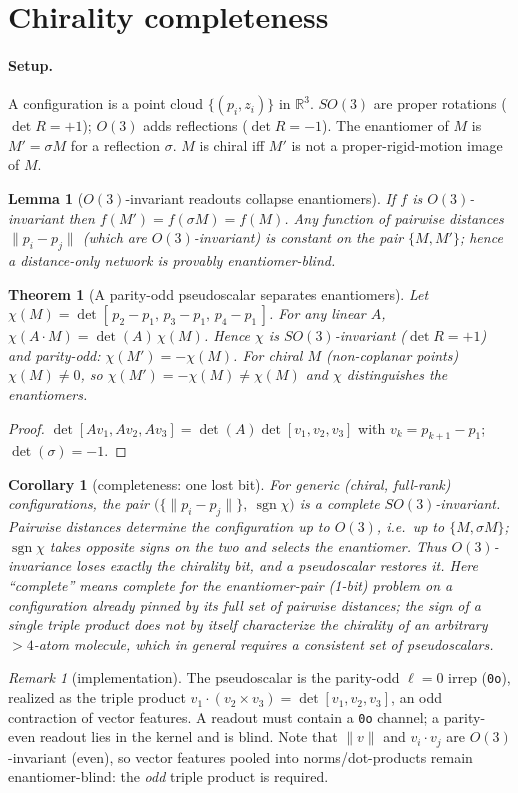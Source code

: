\documentclass[11pt]{article}
\theoremstyle{plain}
\newtheorem{theorem}{Theorem}
\newtheorem{lemma}{Lemma}
\newtheorem{corollary}{Corollary}
\theoremstyle{remark}
\newtheorem{remark}{Remark}
\DeclareMathOperator{\sgn}{sgn}
\newcommand{\Oh}{O(3)}
\newcommand{\SOh}{SO(3)}
\begin{document}
\section*{Chirality completeness}

\paragraph{Setup.} A configuration is a point cloud $\{(p_i,z_i)\}$ in $\mathbb R^3$. $\SOh$ are proper rotations ($\det R=+1$); $\Oh$ adds reflections ($\det R=-1$). The enantiomer of $M$ is $M'=\sigma M$ for a reflection $\sigma$. $M$ is chiral iff $M'$ is not a proper-rigid-motion image of $M$.

\begin{lemma}[$\Oh$-invariant readouts collapse enantiomers]\label{lem:collapse}
If $f$ is $\Oh$-invariant then $f(M')=f(\sigma M)=f(M)$. Any function of pairwise distances $\|p_i-p_j\|$ (which are $\Oh$-invariant) is constant on the pair $\{M,M'\}$; hence a distance-only network is provably enantiomer-blind.
\end{lemma}

\begin{theorem}[A parity-odd pseudoscalar separates enantiomers]\label{thm:chiral}
Let $\chi(M)=\det[\,p_2-p_1,\,p_3-p_1,\,p_4-p_1\,]$. For any linear $A$, $\chi(A\!\cdot\!M)=\det(A)\,\chi(M)$. Hence $\chi$ is $\SOh$-invariant ($\det R=+1$) and parity-odd: $\chi(M')=-\chi(M)$. For chiral $M$ (non-coplanar points) $\chi(M)\neq0$, so $\chi(M')=-\chi(M)\neq\chi(M)$ and $\chi$ distinguishes the enantiomers.
\end{theorem}
\begin{proof}
$\det[A v_1,Av_2,Av_3]=\det(A)\det[v_1,v_2,v_3]$ with $v_k=p_{k+1}-p_1$; $\det(\sigma)=-1$.
\end{proof}

\begin{corollary}[completeness: one lost bit]
For generic (chiral, full-rank) configurations, the pair $\big(\{\|p_i-p_j\|\},\ \sgn\chi\big)$ is a complete $\SOh$-invariant. Pairwise distances determine the configuration up to $\Oh$, i.e.\ up to $\{M,\sigma M\}$; $\sgn\chi$ takes opposite signs on the two and selects the enantiomer. Thus $\Oh$-invariance loses exactly the chirality bit, and a pseudoscalar restores it. Here ``complete'' means complete for the enantiomer-pair (1-bit) problem on a configuration already pinned by its full set of pairwise distances; the sign of a single triple product does not by itself characterize the chirality of an arbitrary $>4$-atom molecule, which in general requires a consistent set of pseudoscalars.
\end{corollary}

\begin{remark}[implementation]
The pseudoscalar is the parity-odd $\ell{=}0$ irrep (\texttt{0o}), realized as the triple product $v_1\!\cdot\!(v_2\times v_3)=\det[v_1,v_2,v_3]$, an odd contraction of vector features. A readout must contain a \texttt{0o} channel; a parity-even readout lies in the kernel and is blind. Note that $\|v\|$ and $v_i\!\cdot\!v_j$ are $\Oh$-invariant (even), so vector features pooled into norms/dot-products remain enantiomer-blind: the \emph{odd} triple product is required.
\end{remark}
\end{document}
